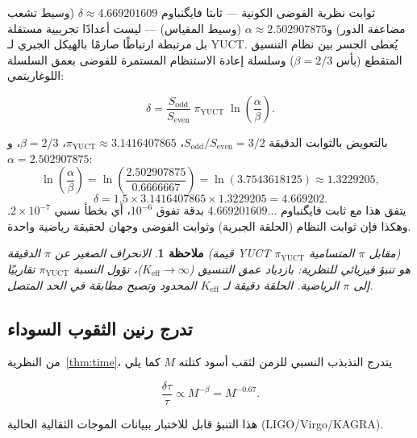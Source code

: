 \documentclass[11pt,a4paper]{article}
\newtheorem{remark}{ملاحظة}
\begin{document}
	ثوابت نظرية الفوضى الكونية — ثابتا فايگنباوم \(\delta \approx 4.669201609\) (وسيط تشعب مضاعفة الدور) و\(\alpha \approx 2.502907875\) (وسيط المقياس) — ليست أعدادًا تجريبية مستقلة بل مرتبطة ارتباطًا صارمًا بالهيكل الجبري لـ YUCT. يُعطى الجسر بين نظام التنسيق المتقطع (بأس \(\beta=2/3\)) وسلسلة إعادة الاستنظام المستمرة للفوضى بعمق السلسلة اللوغاريتمي:
	
	\begin{equation}
		\boxed{\delta = \frac{S_{\mathrm{odd}}}{S_{\mathrm{even}}}
			\; \pi_{\mathrm{YUCT}} \;
			\ln\left( \frac{\alpha}{\beta} \right)}.
		\label{eq:feigenbaum-exact}
	\end{equation}
	
	بالتعويض بالثوابت الدقيقة \(S_{\mathrm{odd}}/S_{\mathrm{even}} = 3/2\)، \(\pi_{\mathrm{YUCT}} \approx 3.1416407865\)، \(\beta = 2/3\)، و\(\alpha = 2.502907875\):
	\[
	\ln\left( \frac{\alpha}{\beta} \right) = \ln\left( \frac{2.502907875}{0.6666667} \right)
	= \ln(3.7543618125) \approx 1.3229205,
	\]
	\[
	\delta = 1.5 \times 3.1416407865 \times 1.3229205 = 4.669202.
	\]
	يتفق هذا مع ثابت فايگنباوم \(4.669201609\ldots\) بدقة تفوق \(10^{-6}\)، أي بخطأ نسبي \(2 \times 10^{-7}\). وهكذا فإن ثوابت النظام (الحلقة الجبرية) وثوابت الفوضى وجهان لحقيقة رياضية واحدة.
	
	\begin{remark}
		الانحراف الصغير عن \(\pi\) الدقيقة (قيمة YUCT \(\pi_{\mathrm{YUCT}}\) مقابل \(\pi\) المتسامية) هو تنبؤ فيزيائي للنظرية: بازدياد عمق التنسيق (\(K_{\mathrm{eff}} \to \infty\))، تؤول النسبة \(\pi_{\mathrm{YUCT}}\) تقاربيًا إلى \(\pi\) الرياضية. الحلقة دقيقة لـ \(K_{\mathrm{eff}}\) المحدود وتصبح مطابقة في الحد المتصل.
	\end{remark}
	
	\subsection{تدرج رنين الثقوب السوداء}
	
	من النظرية~\ref{thm:time}، يتدرج التذبذب النسبي للزمن لثقب أسود كتلته \(M\) كما يلي
	
	\begin{equation}
		\boxed{\frac{\delta \tau}{\tau} \propto M^{-\beta} = M^{-0.67}}.
	\end{equation}
	
	هذا التنبؤ قابل للاختبار ببيانات الموجات الثقالية الحالية (LIGO/Virgo/KAGRA).
	
\end{document}
